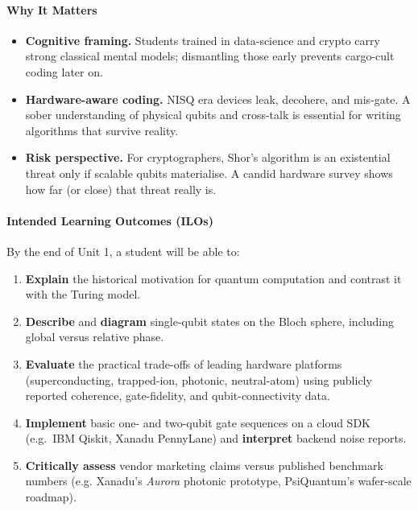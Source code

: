 \documentclass[11pt,a4paper]{article}
\begin{document}
\paragraph{Why It Matters}
\begin{itemize}
	\item \textbf{Cognitive framing.}  Students trained in data-science and crypto carry strong classical mental models; dismantling those early prevents cargo-cult coding later on.
	\item \textbf{Hardware-aware coding.}  NISQ era devices leak, decohere, and mis-gate.  A sober understanding of physical qubits and cross-talk is essential for writing algorithms that survive reality.
	\item \textbf{Risk perspective.}  For cryptographers, Shor’s algorithm is an existential threat only if scalable qubits materialise.  A candid hardware survey shows how far (or close) that threat really is.
\end{itemize}

\paragraph{Intended Learning Outcomes (ILOs)}
By the end of Unit 1, a student will be able to:
\begin{enumerate}
	\item \textbf{Explain} the historical motivation for quantum computation and contrast it with the Turing model.
	\item \textbf{Describe} and \textbf{diagram} single-qubit states on the Bloch sphere, including global versus relative phase.
	\item \textbf{Evaluate} the practical trade-offs of leading hardware platforms (superconducting, trapped-ion, photonic, neutral-atom) using publicly reported coherence, gate-fidelity, and qubit-connectivity data.
	\item \textbf{Implement} basic one- and two-qubit gate sequences on a cloud SDK (e.g.\ IBM Qiskit, Xanadu PennyLane) and \textbf{interpret} backend noise reports.
	\item \textbf{Critically assess} vendor marketing claims versus published benchmark numbers (e.g. Xanadu’s \emph{Aurora} photonic prototype, PsiQuantum’s wafer-scale roadmap).
\end{enumerate}

\end{document}
